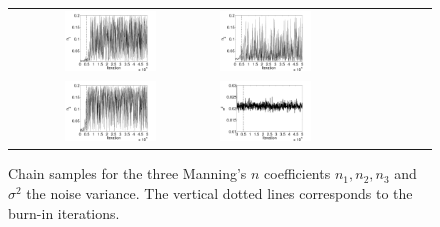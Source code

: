 \documentclass[review,12pt]{elsarticle}
\begin{document}
\begin{figure}[ht]
\begin{tabular}{clc}
\includegraphics[width=0.475\textwidth]{Figure14a.pdf} &
\includegraphics[width=0.475\textwidth]{Figure14b.pdf} \\
\includegraphics[width=0.475\textwidth]{Figure14c.pdf} &
\includegraphics[width=0.475\textwidth]{Figure14d.pdf}
\end{tabular}
\caption{Chain samples for the three Manning's $n$ coefficients $n_1,n_2,n_3$ and $\sigma^2$
the noise variance. The vertical dotted lines corresponds to the
burn-in iterations.}
\label{fig:mcmc} 
\end{figure}
\end{document}
